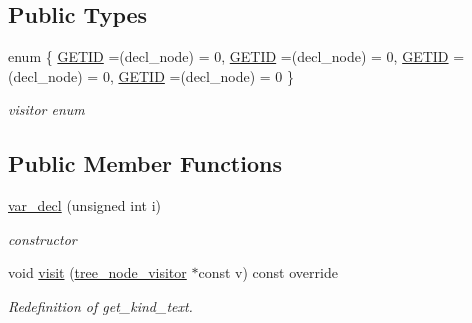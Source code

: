 \subsection*{Public Types}
\begin{DoxyCompactItemize}
\item 
enum \{ \hyperlink{structvar__decl_aacda5ecd2774d0af9aa1e0799c30c297abb593bc84d69f092d169b635524d9117}{G\+E\+T\+ID} =(decl\+\_\+node) = 0, 
\hyperlink{structvar__decl_aacda5ecd2774d0af9aa1e0799c30c297abb593bc84d69f092d169b635524d9117}{G\+E\+T\+ID} =(decl\+\_\+node) = 0, 
\hyperlink{structvar__decl_aacda5ecd2774d0af9aa1e0799c30c297abb593bc84d69f092d169b635524d9117}{G\+E\+T\+ID} =(decl\+\_\+node) = 0, 
\hyperlink{structvar__decl_aacda5ecd2774d0af9aa1e0799c30c297abb593bc84d69f092d169b635524d9117}{G\+E\+T\+ID} =(decl\+\_\+node) = 0
 \}\begin{DoxyCompactList}\small\item\em visitor enum \end{DoxyCompactList}
\end{DoxyCompactItemize}
\subsection*{Public Member Functions}
\begin{DoxyCompactItemize}
\item 
\hyperlink{structvar__decl_ac6a839dc0afda018e929b69aaaca7d35}{var\+\_\+decl} (unsigned int i)
\begin{DoxyCompactList}\small\item\em constructor \end{DoxyCompactList}\item 
void \hyperlink{structvar__decl_ad28f066d3483ec9ca4b7839c1af19c6f}{visit} (\hyperlink{classtree__node__visitor}{tree\+\_\+node\+\_\+visitor} $\ast$const v) const override
\begin{DoxyCompactList}\small\item\em Redefinition of get\+\_\+kind\+\_\+text. \end{DoxyCompactList}\end{DoxyCompactItemize}

